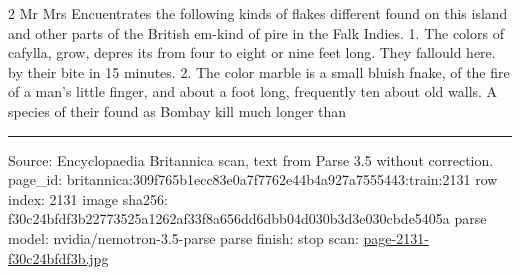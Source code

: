 \documentclass[10pt]{article}
\begin{document}
\begin{multicols}{2}
Mr Mrs Encuentrates the following kinds of flakes different found on this island and other parts of the British em-kind of pire in the Falk Indies. 1. The colors of cafylla, grow, depres its from four to eight or nine feet long. They fallould here. by their bite in 15 minutes. 2. The color marble is a small bluish fnake, of the fire of a man's little finger, and about a foot long, frequently ten about old walls. A species of their found as Bombay kill much longer than

\end{multicols}
\vfill\par\noindent\rule{\linewidth}{0.4pt}\par
{\scriptsize\color{gray}\noindent Source: Encyclopaedia Britannica scan, text from Parse 3.5 without correction. page\_id: britannica:309f765b1ecc83e0a7f7762e44b4a927a7555443:train:2131 \quad row index: 2131 \quad image sha256: f30c24bfdf3b22773525a1262af33f8a656dd6dbb04d030b3d3e030cbde5405a \quad parse model: nvidia/nemotron-3.5-parse \quad parse finish: stop \quad scan: \href{../scans/page-2131-f30c24bfdf3b.jpg}{page-2131-f30c24bfdf3b.jpg}\par}
\end{document}
